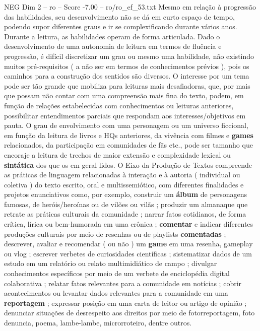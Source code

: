 \begin{textsample}{NEG Dim 2 – ro – Score -7.00 – ro/ro\_ef\_53.txt}
Mesmo em relação à progressão das habilidades, seu desenvolvimento não se dá em curto espaço de tempo, podendo supor diferentes graus e ir se complexificando durante vários anos.
Durante a leitura, as habilidades operam de forma articulada.
Dado o desenvolvimento de uma autonomia de leitura em termos de fluência e progressão, é difícil discretizar um grau ou mesmo uma habilidade, não existindo muitos pré-requisitos ( a não ser em termos de conhecimentos prévios ), pois os caminhos para a construção dos sentidos são diversos.
O interesse por um tema pode ser tão grande que mobiliza para leituras mais desafiadoras, que, por mais que possam não contar com uma compreensão mais fina do texto, podem, em função de relações estabelecidas com conhecimentos ou leituras anteriores, possibilitar entendimentos parciais que respondam aos interesses/objetivos em pauta.
O grau de envolvimento com uma personagem ou um universo ficcional, em função da leitura de livros e HQs anteriores, da vivência com filmes e \textbf{games} relacionados, da participação em comunidades de fãs etc., pode ser tamanho que encoraje a leitura de trechos de maior extensão e complexidade lexical ou \textbf{sintática} dos que os em geral lidos.
O Eixo da Produção de Textos compreende as práticas de linguagem relacionadas à interação e à autoria ( individual ou coletiva ) do texto escrito, oral e multissemiótico, com diferentes finalidades e projetos enunciativos como, por exemplo, construir um \textbf{álbum} de personagens famosas, de heróis/heroínas ou de vilões ou vilãs ; produzir um almanaque que retrate as práticas culturais da comunidade ; narrar fatos cotidianos, de forma crítica, lírica ou bem-humorada em uma crônica ; \textbf{comentar} e indicar diferentes produções culturais por meio de resenhas ou de playlists \textbf{comentadas} ; descrever, avaliar e recomendar ( ou não ) um \textbf{game} em uma resenha, gameplay ou vlog ; escrever verbetes de curiosidades científicas ; sistematizar dados de um estudo em um relatório ou relato multimidiático de campo ; divulgar conhecimentos específicos por meio de um verbete de enciclopédia digital colaborativa ; relatar fatos relevantes para a comunidade em notícias ; cobrir acontecimentos ou levantar dados relevantes para a comunidade em uma \textbf{reportagem} ; expressar posição em uma carta de leitor ou artigo de opinião ; denunciar situações de desrespeito aos direitos por meio de fotorreportagem, foto denuncia, poema, lambe-lambe, microrroteiro, dentre outros.

\end{textsample}
